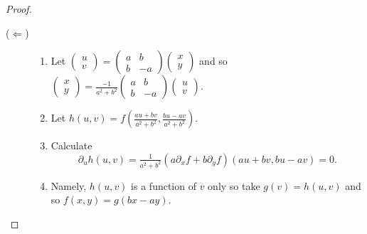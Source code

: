 \documentclass[aspectratio=169,handout]{beamer}
\begin{document}
\begin{frame}
\begin{proof}
\begin{description}
            \item[(\(\Leftarrow\))]
                  \begin{enumerate}
                    \item Let \(\left(\begin{smallmatrix}
                        u\\ v
                    \end{smallmatrix}\right)
                    = \left(\begin{smallmatrix}
                        a & b \\ b & -a
                    \end{smallmatrix}\right)
                    \left(\begin{smallmatrix}
                        x \\ y
                    \end{smallmatrix}\right)\)
                    and so 
                    \(\left(\begin{smallmatrix}
                        x\\ y
                    \end{smallmatrix}\right)
                    = \frac{-1}{a^2 + b^2} \left(\begin{smallmatrix}
                        a & b \\ b & -a
                    \end{smallmatrix}\right)
                    \left(\begin{smallmatrix}
                        u \\ v
                    \end{smallmatrix}\right)\).
                      \item Let \(h(u,v)=f(\frac{au + bv}{a^2 + b^2}, \frac{bu-av}{a^2+b^2})\).
                      \item Calculate
                            \[
                                \partial_u h(u,v)
                                = \tfrac{1}{{a^2 + b^2}}
                                \left( a \partial_x f
                                + b \partial_y f \right)  (au + bv, bu-av) = 0.
                            \]
                      \item Namely, \(h(u,v)\) is a function of \(v\) only so take \(g(v) = h(u,v)\) and so \(f(x,y) = g(bx-ay)\).
                  \end{enumerate}
        \end{description}

    \end{proof}



\end{frame}
\end{document}
